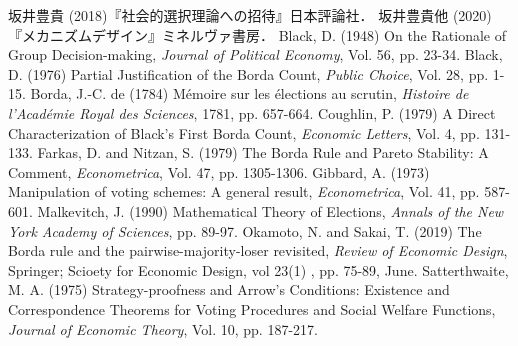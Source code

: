 \documentclass[dvipdfmx]{jsarticle}
\begin{document}
\begin{thebibliography}{9}
  坂井豊貴 (2018)『社会的選択理論への招待』日本評論社．
  坂井豊貴他 (2020)『メカニズムデザイン』ミネルヴァ書房．
  Black, D. (1948) On the Rationale of Group Decision-making, \textit{Journal of Political Economy},
  Vol. 56, pp. 23-34.
  Black, D. (1976) Partial Justification of the Borda Count, \textit{Public Choice},
  Vol. 28, pp. 1-15.
  Borda, J.-C. de (1784) M\'{e}moire sur les \'{e}lections au scrutin, \textit{Histoire de l'Acad\'{e}mie
  Royal des Sciences}, 1781, pp. 657-664.
  Coughlin, P. (1979) A Direct Characterization of Black's First Borda Count,
  \textit{Economic Letters}, Vol. 4, pp. 131-133.
  Farkas, D. and Nitzan, S. (1979) The Borda Rule and Pareto Stability: A Comment,
  \textit{Econometrica}, Vol. 47, pp. 1305-1306.
  Gibbard, A. (1973) Manipulation of voting schemes: A general result, \textit{Econometrica}, Vol. 41,
  pp. 587-601.
    Malkevitch, J. (1990) Mathematical Theory of Elections, \textit{Annals of the New York
    Academy of Sciences}, pp. 89-97.
  Okamoto, N. and Sakai, T. (2019) The Borda rule and the pairwise-majority-loser
  revisited, \textit{Review of Economic Design}, Springer; Scioety for Economic Design, vol 23(1)
  , pp. 75-89, June.
  Satterthwaite, M. A. (1975) Strategy-proofness and Arrow's Conditions:
  Existence and Correspondence Theorems for Voting Procedures and Social
  Welfare Functions, \textit{Journal of Economic Theory}, Vol. 10, pp. 187-217.
\end{thebibliography}
\end{document}

